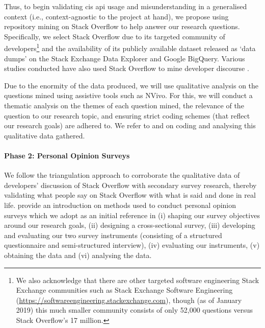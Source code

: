 Thus, to begin validating \gls{cis} \gls{api} usage and misunderstanding in a generalised context (i.e., context-agnostic to the project at hand), we propose using repository mining on Stack Overflow to help answer our research questions. Specifically, we select Stack Overflow due to its targeted community of developers\footnote{We also acknowledge that there are other targeted software engineering Stack Exchange communities such as Stack Exchange Software Engineering (\url{https://softwareengineering.stackexchange.com}), though (as of January 2019) this much smaller community consists of only 52,000 questions versus Stack Overflow's 17 million.} and the availability of its publicly available dataset released as `data dumps' on the Stack Exchange Data Explorer and Google BigQuery. Various studies conducted have also used Stack Overflow to mine developer discourse .

Due to the enormity of the data produced, we will use qualitative analysis on the questions mined using assistive tools such as NVivo. For this, we will conduct a thematic analysis on the themes of each question mined, the relevance of the question to our research topic, and ensuring strict coding schemes (that reflect our research goals) are adhered to. We refer to \citet{Singer:2007tu} and  on coding and analysing this qualitative data gathered.

\paragraph{Phase 2: Personal Opinion Surveys}
We follow the triangulation approach  to corroborate the qualitative data of developers' discussion of Stack Overflow with secondary survey research, thereby validating what people say on Stack Overflow with what is said and done in real life. \citet{Kitchenham:2007ux} provide an introduction on methods used to conduct personal opinion surveys which we adopt as an initial reference in (i) shaping our survey objectives around our research goals, (ii) designing a cross-sectional survey, (iii) developing and evaluating our two survey instruments (consisting of a structured questionnaire and semi-structured interview), (iv) evaluating our instruments, (v) obtaining the data and (vi) analysing the data.

